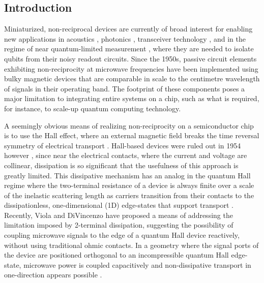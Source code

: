 \subsection{Introduction}
Miniaturized, non-reciprocal devices are currently of broad interest for enabling new applications in acoustics \cite{fleury2014sound}, photonics \cite{feng2011nonreciprocal,bi2011chip}, transceiver technology \cite{estep2014magnetic}, and in the regime of near quantum-limited measurement \cite{stace2004mesoscopic,kerckhoff2015chip,abdo2013directional,sliwa2015reconfigurable,PhysRevX.4.021019}, where they are needed to isolate qubits from their noisy readout circuits.
Since the 1950s, passive circuit elements exhibiting non-reciprocity at microwave frequencies have been implemented using bulky magnetic devices that are comparable in scale to the centimetre wavelength of signals in their operating band. The footprint of these components poses a major limitation to integrating entire systems on a chip, such as what is required, for instance, to scale-up quantum computing technology.

A seemingly obvious means of realizing non-reciprocity on a semiconductor chip is to use the Hall effect, where an external magnetic field breaks the time reversal symmetry of electrical transport \cite{mason1953hall}. Hall-based devices were ruled out in 1954 however \cite{wick1954solution}, since near the electrical contacts, where the current and voltage are collinear, dissipation is so significant that the usefulness of this approach is greatly limited. This dissipative mechanism has an analog in the quantum Hall regime where the two-terminal resistance of a device is always finite over a scale of the inelastic scattering length as carriers transition from their contacts to the dissipationless, one-dimensional (1D) edge-states that support transport \cite{buttiker1988absence}. Recently, Viola and DiVincenzo \cite{PhysRevX.4.021019} have proposed a means of addressing the limitation imposed by 2-terminal dissipation, suggesting the possibility of coupling microwave signals to the edge of a quantum Hall device reactively, without using traditional ohmic contacts. In a geometry where the signal ports of the device are positioned orthogonal to an incompressible quantum Hall edge-state, microwave power is coupled capacitively and non-dissipative transport in one-direction appears possible \cite{PhysRevX.4.021019}.

